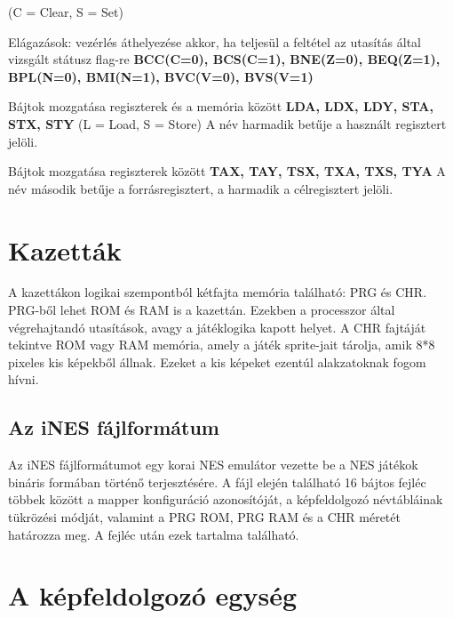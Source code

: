 \begin{compactdesc}
	\newline
	(C = Clear, S = Set)
	\item Elágazások: vezérlés áthelyezése akkor, ha teljesül a feltétel az utasítás által vizsgált státusz flag-re
	\newline \textbf{BCC(C=0), BCS(C=1), BNE(Z=0), BEQ(Z=1), BPL(N=0), BMI(N=1),  BVC(V=0), BVS(V=1)}
	\item Bájtok mozgatása regiszterek és a memória között
	\newline
	\textbf{LDA, LDX, LDY, STA, STX, STY} 
	\newline
	(L = Load, S = Store)
	\newline
	A név harmadik betűje a használt regisztert jelöli.
	\item Bájtok mozgatása regiszterek között
	\newline
	\textbf{TAX, TAY, TSX, TXA, TXS, TYA}
	\newline
	A név második betűje a forrásregisztert, a harmadik a célregisztert jelöli.
\end{compactdesc}

\section{Kazetták \cite{ref}}

A kazettákon logikai szempontból kétfajta memória található: PRG és CHR.
PRG-ből lehet ROM és RAM is a kazettán. Ezekben a processzor által végrehajtandó utasítások, avagy a játéklogika kapott helyet. A CHR fajtáját tekintve ROM vagy RAM memória, amely a játék sprite-jait tárolja, amik 8*8 pixeles kis képekből állnak. Ezeket a kis képeket ezentúl alakzatoknak fogom hívni. 

\subsection{Az iNES fájlformátum \cite{ref} \cite{ines}}

Az iNES fájlformátumot egy korai NES emulátor vezette be a NES játékok bináris formában történő terjesztésére. A fájl elején található 16 bájtos fejléc többek között a mapper konfiguráció azonosítóját, a képfeldolgozó névtábláinak tükrözési módját, valamint a PRG ROM, PRG RAM és a CHR méretét határozza meg. A fejléc után ezek tartalma található.

\section{A képfeldolgozó egység}


